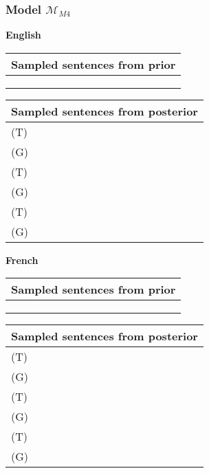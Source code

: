 \subsubsection{Model $\mathcal{M}_{M4}$}

\textbf{English}

\begin{center}
  \begin{tabular}{|L{14cm}|} 
    \hline
    Sampled sentences from prior\\
    \hline\hline
    \\
    \hline
    \\
    \hline
    \\
    \hline
  \end{tabular}
\end{center}

\begin{center}
  \begin{tabular}{|L{14cm}|} 
    \hline
    Sampled sentences from posterior\\ [0.5ex] 
    \hline\hline
    (T) \\
    (G) \\
    \hline
    (T) \\
    (G) \\
    \hline
    (T) \\
    (G) \\
    \hline
  \end{tabular}
\end{center}

\textbf{French}

\begin{center}
  \begin{tabular}{|L{14cm}|} 
    \hline
    Sampled sentences from prior\\
    \hline\hline
    \\
    \hline
    \\
    \hline
    \\
    \hline
  \end{tabular}
\end{center}

\begin{center}
  \begin{tabular}{|L{14cm}|} 
    \hline
    Sampled sentences from posterior\\ [0.5ex] 
    \hline\hline
    (T) \\
    (G) \\
    \hline
    (T) \\
    (G) \\
    \hline
    (T) \\
    (G) \\
    \hline
  \end{tabular}
\end{center}
